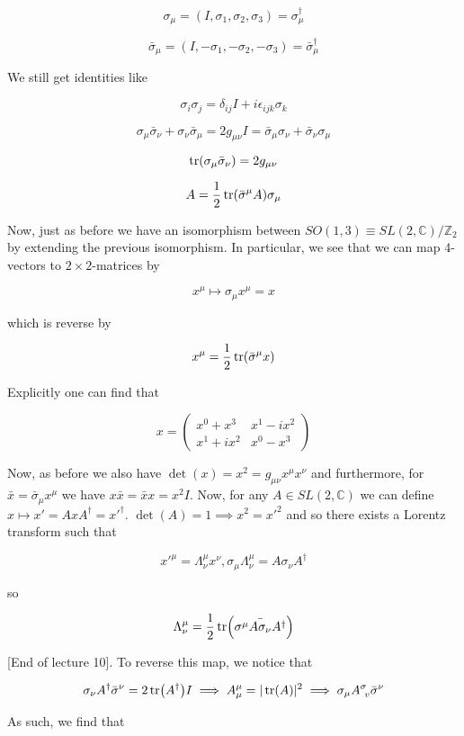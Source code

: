 \documentclass{article}
\theoremstyle{definition}
\begin{document}
$$ \sigma_\mu = (I, \sigma_1, \sigma_2, \sigma_3) = \sigma_\mu^\dagger $$

$$ \bar{\sigma}_\mu = (I, -\sigma_1, -\sigma_2, -\sigma_3) =
\bar{\sigma}_\mu^\dagger $$

We still get identities like

$$ \sigma_i \sigma_j = \delta_{ij} I + i \epsilon_{ijk} \sigma_k $$

$$ \sigma_\mu \bar{\sigma}_\nu + \sigma_\nu \bar{\sigma}_\mu = 2 g_{\mu \nu} I =
\bar{\sigma}_\mu \sigma_\nu + \bar{\sigma}_\nu \sigma_\mu $$

$$ \tr(\sigma_\mu \bar{\sigma}_\nu) = 2g_{\mu \nu} $$

$$ A = \frac{1}{2} \tr(\bar{\sigma}^\mu A) \sigma_\mu $$

Now, just as before we have an isomorphism between $SO(1, 3) \equiv SL(2,
\mathbb{C}) / \mathbb{Z}_2$ by extending the previous isomorphism. In
particular, we see that we can map 4-vectors to $2 \times 2$-matrices by

$$ x^\mu \mapsto \sigma_\mu x^\mu = x $$

which is reverse by

$$ x^\mu = \frac{1}{2} \tr(\bar{\sigma}^\mu x) $$

Explicitly one can find that

$$ x = 
\begin{pmatrix}
x^0 + x^3 & x^1 - ix^2 \\
x^1 + ix^2 & x^0 - x^3 
\end{pmatrix} $$

Now, as before we also have $\det(x) = x^2 = g_{\mu \nu} x^\mu x^\nu$ and
furthermore, for $\bar{x} = \bar{\sigma}_\mu x^\mu$ we have $x\bar{x} = \bar{x}x
= x^2 I$. Now, for any $A \in SL(2, \mathbb{C})$ we can define $x \mapsto x' =
AxA^\dagger = x'^\dagger$. $\det(A) = 1 \implies x^2 = x'^2$ and so there exists
a Lorentz transform such that

$$ x'^\mu = \Lambda^\mu_\nu x^\nu, \sigma_\mu\Lambda^\mu_\nu = A \sigma_\nu
A^\dagger $$

so

$$ \Lambda^\mu_\nu = \frac{1}{2} \tr(\bar{\sigma^\mu A \sigma_\nu A^\dagger}) $$

[End of lecture 10]. To reverse this map, we notice that

$$ \sigma_\nu A^\dagger \bar{\sigma}^\nu = 2\tr(A^\dagger) I \implies A^\mu_\mu
= |\tr(A)|^2 \implies \sigma_\mu A^\sigma_{\ v}\bar{\sigma}^\nu $$

As such, we find that
\end{document}
